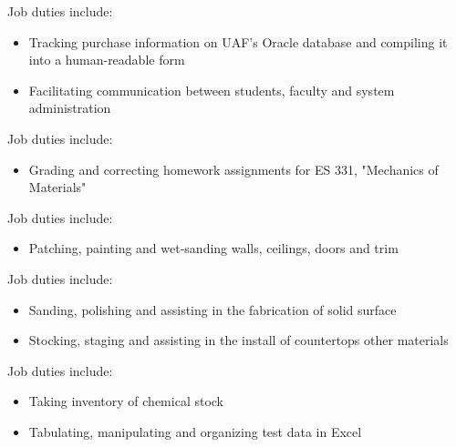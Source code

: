 \documentclass{resume}
\begin{document}
    \normalsize
    Job duties include:
    \small\begin{itemize}
    
        \item Tracking purchase information on UAF's Oracle database and compiling it into a human-readable form
    
        \item Facilitating communication between students, faculty and system administration
    
    \end{itemize}\normalsize

    \normalsize
    Job duties include:
    \small\begin{itemize}
    
        \item Grading and correcting homework assignments for ES 331, "Mechanics of Materials"
    
    \end{itemize}\normalsize

    \normalsize
    Job duties include:
    \small\begin{itemize}
    
        \item Patching, painting and wet-sanding walls, ceilings, doors and trim
    
    \end{itemize}\normalsize

    \normalsize
    Job duties include:
    \small\begin{itemize}
    
        \item Sanding, polishing and assisting in the fabrication of solid surface
    
        \item Stocking, staging and assisting in the install of countertops other materials
    
    \end{itemize}\normalsize

    \normalsize
    Job duties include:
    \small\begin{itemize}
    
        \item Taking inventory of chemical stock
    
        \item Tabulating, manipulating and organizing test data in Excel
    
    \end{itemize}\normalsize
\end{document}
